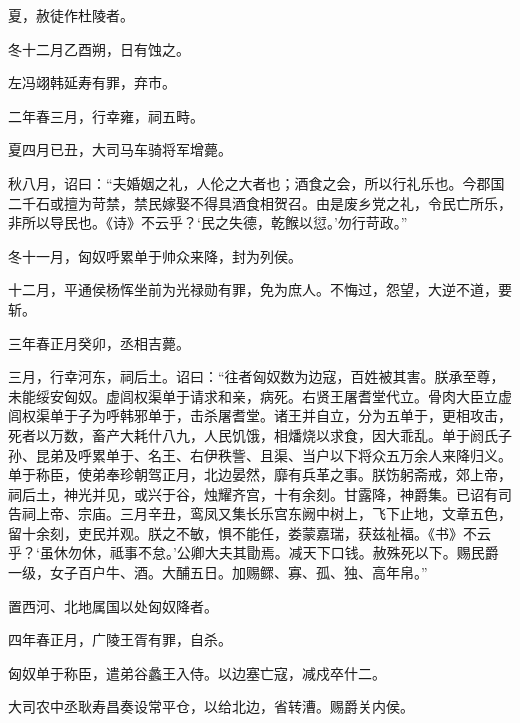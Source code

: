 \documentclass[12pt,UTF8]{ctexbook}
\begin{document}
夏，赦徒作杜陵者。



冬十二月乙酉朔，日有蚀之。



左冯翊韩延寿有罪，弃市。



二年春三月，行幸雍，祠五畤。



夏四月已丑，大司马车骑将军增薨。



秋八月，诏曰：“夫婚姻之礼，人伦之大者也；酒食之会，所以行礼乐也。今郡国二千石或擅为苛禁，禁民嫁娶不得具酒食相贺召。由是废乡党之礼，令民亡所乐，非所以导民也。《诗》不云乎？‘民之失德，乾餱以愆。’勿行苛政。”



冬十一月，匈奴呼累单于帅众来降，封为列侯。



十二月，平通侯杨恽坐前为光禄勋有罪，免为庶人。不悔过，怨望，大逆不道，要斩。



三年春正月癸卯，丞相吉薨。



三月，行幸河东，祠后土。诏曰：“往者匈奴数为边寇，百姓被其害。朕承至尊，未能绥安匈奴。虚闾权渠单于请求和亲，病死。右贤王屠耆堂代立。骨肉大臣立虚闾权渠单于子为呼韩邪单于，击杀屠耆堂。诸王并自立，分为五单于，更相攻击，死者以万数，畜产大耗什八九，人民饥饿，相燔烧以求食，因大乖乱。单于阏氏子孙、昆弟及呼累单于、名王、右伊秩訾、且渠、当户以下将众五万余人来降归义。单于称臣，使弟奉珍朝驾正月，北边晏然，靡有兵革之事。朕饬躬斋戒，郊上帝，祠后土，神光并见，或兴于谷，烛耀齐宫，十有余刻。甘露降，神爵集。已诏有司告祠上帝、宗庙。三月辛丑，鸾凤又集长乐宫东阙中树上，飞下止地，文章五色，留十余刻，吏民并观。朕之不敏，惧不能任，娄蒙嘉瑞，获兹祉福。《书》不云乎？‘虽休勿休，祗事不怠。’公卿大夫其勖焉。减天下口钱。赦殊死以下。赐民爵一级，女子百户牛、酒。大酺五日。加赐鳏、寡、孤、独、高年帛。”



置西河、北地属国以处匈奴降者。



四年春正月，广陵王胥有罪，自杀。



匈奴单于称臣，遣弟谷蠡王入侍。以边塞亡寇，减戍卒什二。



大司农中丞耿寿昌奏设常平仓，以给北边，省转漕。赐爵关内侯。
\end{document}
